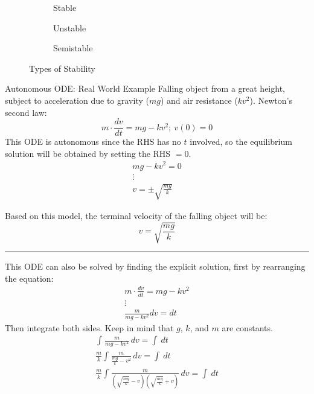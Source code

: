 \documentclass[12pt]{article}
\begin{document}
\begin{figure}[H]
  \centering
  \begin{subfigure}[H]{0.30\textwidth}
    \centering
    
    \caption{Stable}
    \label{fig:006}
  \end{subfigure}
  \begin{subfigure}[H]{0.30\textwidth}
    \centering
    
    \caption{Unstable}
    \label{fig:007}
  \end{subfigure}
  \begin{subfigure}[H]{0.30\textwidth}
    \centering
    
    \caption{Semistable}
    \label{fig:008}
  \end{subfigure}
  \caption{Types of Stability}
  \label{fig:typesOfStability}
\end{figure}

\begin{example}{Autonomous ODE: Real World Example}
  Falling object from a great height, subject to acceleration due to gravity ($mg$) and air resistance ($kv^2$). Newton's second law:
  \begin{equation*}
    m \cdot \frac{dv}{dt} = mg - kv^2;\ v(0) = 0
  \end{equation*}
  This ODE is autonomous since the RHS has no $t$ involved, so the equilibrium solution will be obtained by setting the RHS $= 0$.
  \begin{gather*}
    mg-kv^2 = 0 \\
    \vdots \\
    v = \pm \sqrt{\frac{mg}{k}}
  \end{gather*}

  Based on this model, the terminal velocity of the falling object will be:
  \begin{equation*}
    v = \sqrt{\frac{mg}{k}}
  \end{equation*}
  \hrule
  \vspace{12pt}
  This ODE can also be solved by finding the explicit solution, first by rearranging the equation:
  \begin{gather*}
    m \cdot \frac{dv}{dt} = mg - kv^2 \\
    \vdots \\
    \frac{m}{mg-kv^2}dv = dt
  \end{gather*}
  Then integrate both sides. Keep in mind that $g$, $k$, and $m$ are constants.
  \begin{gather*}
    \int_{}^{} \frac{m}{mg-kv^2} \,dv = \int_{}^{}  \,dt \\
    \frac{m}{k}\int_{}^{} \frac{m}{\frac{mg}{k}-v^2} \,dv = \int_{}^{}  \,dt \\
    \frac{m}{k}\int_{}^{} \frac{m}{\left(\sqrt{\frac{mg}{k}}-v\right)\left(\sqrt{\frac{mg}{k}}+v\right)} \,dv = \int_{}^{}  \,dt \\
  \end{gather*}
\end{example}
\end{document}

